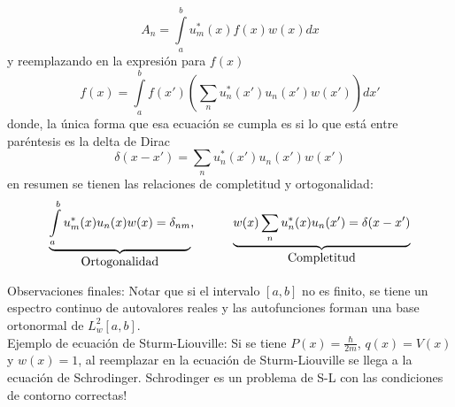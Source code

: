 \begin{equation*}
    A_{n} 
    = \int\limits_{a}^{b}u_{m}^{*}(x)f(x)w(x)dx
\end{equation*}
y reemplazando en la expresión para $f(x)$
\begin{equation*}
    f(x) = \int\limits_{a}^{b}f(x')
    \left(
        \sum\limits_{n}
        u_{n}^{*}(x')u_{n}(x')w(x')
    \right)dx'
\end{equation*}
donde, la única forma que esa ecuación se cumpla es si lo que está entre paréntesis es la delta de Dirac
\begin{equation}
    \delta(x-x')
    = \sum\limits_{n}
    u_{n}^{*}(x')u_{n}(x')w(x')
        \label{ec:DeltaDiracDiscreta}
\end{equation}
en resumen se tienen las relaciones de completitud y ortogonalidad:
\begin{equation*}
    \underbrace{%
    \int\limits_{a}^{b}
    u_{m}^{*}(x)u_{n}(x)w(x) = \delta_{nm}}_{\mbox{Ortogonalidad}},
    \quad
    \quad
    \quad
    \underbrace{%
    w(x)\sum\limits_{n}
    u_{n}^{*}(x)u_{n}(x') = \delta(x-x')}_{\mbox{Completitud}}
\end{equation*}

Observaciones finales: Notar que si el intervalo $[a,b]$ no es finito, se tiene un espectro continuo de autovalores reales y las autofunciones forman una base ortonormal de $L_{w}^{2}[a,b]$.\\
\indent Ejemplo de ecuación de Sturm-Liouville: Si se tiene $P(x) = \frac{\hbar}{2m}$, $q(x) = V(x)$ y $w(x) = 1$, al reemplazar en la ecuación de Sturm-Liouville se llega a la ecuación de Schrodinger. Schrodinger es un problema de S-L con las condiciones de contorno correctas!





